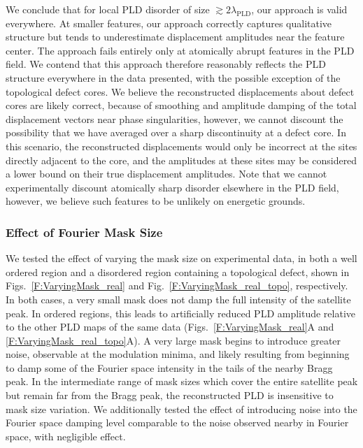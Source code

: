 \documentclass[12pt]{article}
\begin{document}
We conclude that for local PLD disorder of size $\gtrsim2\lambda_\text{PLD}$, our approach is valid everywhere.
At smaller features, our approach correctly captures qualitative structure but tends to underestimate displacement amplitudes near the feature center.
The approach fails entirely only at atomically abrupt features in the PLD field.
We contend that this approach therefore reasonably reflects the PLD structure everywhere in the data presented, with the possible exception of the topological defect cores.
We believe the reconstructed displacements about defect cores are likely correct, because of smoothing and amplitude damping of the total displacement vectors near phase singularities, however, we cannot discount the possibility that we have averaged over a sharp discontinuity at a defect core.
In this scenario, the reconstructed displacements would only be incorrect at the sites directly adjacent to the core, and the amplitudes at these sites may be considered a lower bound on their true displacement amplitudes.
Note that we cannot experimentally discount atomically sharp disorder elsewhere in the PLD field, however, we believe such features to be unlikely on energetic grounds.





\subsubsection*{Effect of Fourier Mask Size}
We tested the effect of varying the mask size on experimental data, in both a well ordered region and a disordered region containing a topological defect, shown in Figs.~\ref{F:VaryingMask_real} and Fig.~\ref{F:VaryingMask_real_topo}, respectively.
In both cases, a very small mask does not damp the full intensity of the satellite peak.
In ordered regions, this leads to artificially reduced PLD amplitude relative to the other PLD maps of the same data (Figs.~\ref{F:VaryingMask_real}A and \ref{F:VaryingMask_real_topo}A).
A very large mask begins to introduce greater noise, observable at the modulation minima, and likely resulting from beginning to damp some of the Fourier space intensity in the tails of the nearby Bragg peak.
In the intermediate range of mask sizes which cover the entire satellite peak but remain far from the Bragg peak, the reconstructed PLD is insensitive to mask size variation.  
We additionally tested the effect of introducing noise into the Fourier space damping level comparable to the noise observed nearby in Fourier space, with negligible effect.
\end{document}
